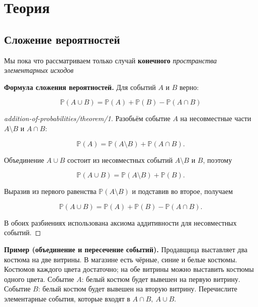 
\section{Теория}

\subsection{Сложение вероятностей}

Мы пока что рассматриваем только случай \textbf{конечного} \emph{пространства элементарных исходов}

\begin{theorem}\label{theorem-1}
\textbf{Формула сложения вероятностей.} Для событий $A$ и $B$ верно:

\[\mathbb{P}(A\cup B) = \mathbb{P}(A) + \mathbb{P}(B) - \mathbb{P}(A\cap B)\]
\end{theorem}

\begin{proof}[addition-of-probabilities/theorem/1]\label{solution-addition-of-probabilities-theorem-1}
Разобьём событие $A$ на несовместные части $A\setminus B$ и $A\cap B$:

\[\mathbb P(A)=\mathbb P(A\setminus B)+\mathbb P(A\cap B).\]

Объединение $A\cup B$ состоит из несовместных событий $A\setminus B$ и $B$, поэтому

\[\mathbb P(A\cup B)=\mathbb P(A\setminus B)+\mathbb P(B).\]

Выразив из первого равенства $\mathbb P(A\setminus B)$ и подставив во второе, получаем

\[\mathbb P(A\cup B)=\mathbb P(A)+\mathbb P(B)-\mathbb P(A\cap B).\]

В обоих разбиениях использована аксиома аддитивности для несовместных событий.
\end{proof}

\begin{example}\label{task-example}
\textbf{Пример (объединение и пересечение событий).} Продавщица выставляет два костюма на две витрины. В магазине есть чёрные, синие и белые костюмы. Костюмов каждого цвета достаточно; на обе витрины можно выставить костюмы одного цвета. Событие $A$: белый костюм будет вывешен на первую витрину. Событие $B$: белый костюм будет вывешен на вторую витрину. Перечислите элементарные события, которые входят в $A \cap B,\ A\cup B$.
\end{example}

